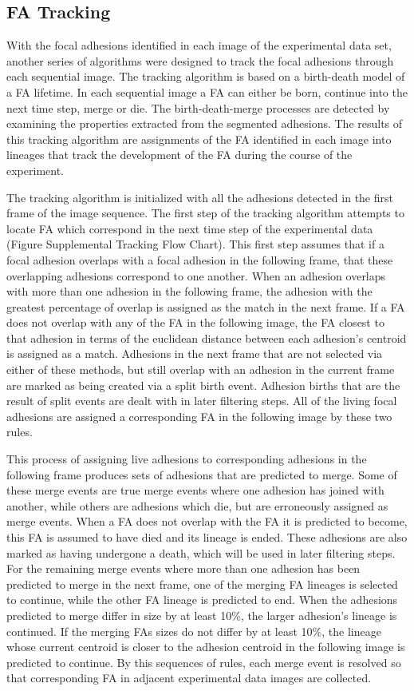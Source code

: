 \documentclass[10pt]{article}
\begin{document}
\subsection*{FA Tracking}

With the focal adhesions identified in each image of the experimental data set,
another series of algorithms were designed to track the focal adhesions through
each sequential image. The tracking algorithm is based on a birth-death model of
a FA lifetime. In each sequential image a FA can either be born, continue into
the next time step, merge or die. The birth-death-merge processes are detected
by examining the properties extracted from the segmented adhesions. The results
of this tracking algorithm are assignments of the FA identified in each image
into lineages that track the development of the FA during the course of the
experiment.

The tracking algorithm is initialized with all the adhesions detected in the
first frame of the image sequence. The first step of the tracking algorithm
attempts to locate FA which correspond in the next time step of the experimental
data (Figure Supplemental Tracking Flow Chart). This first step assumes that if
a focal adhesion overlaps with a focal adhesion in the following frame, that
these overlapping adhesions correspond to one another. When an adhesion overlaps
with more than one adhesion in the following frame, the adhesion with the
greatest percentage of overlap is assigned as the match in the next frame. If a
FA does not overlap with any of the FA in the following image, the FA closest to
that adhesion in terms of the euclidean distance between each adhesion's
centroid is assigned as a match. Adhesions in the next frame that are not
selected via either of these methods, but still overlap with an adhesion in the
current frame are marked as being created via a split birth event. Adhesion
births that are the result of split events are dealt with in later filtering
steps. All of the living focal adhesions are assigned a corresponding FA in the
following image by these two rules.

This process of assigning live adhesions to corresponding adhesions in the
following frame produces sets of adhesions that are predicted to merge. Some of
these merge events are true merge events where one adhesion has joined with
another, while others are adhesions which die, but are erroneously assigned as
merge events. When a FA does not overlap with the FA it is predicted to become,
this FA is assumed to have died and its lineage is ended. These adhesions are
also marked as having undergone a death, which will be used in later filtering
steps. For the remaining merge events where more than one adhesion has been
predicted to merge in the next frame, one of the merging FA lineages is selected
to continue, while the other FA lineage is predicted to end. When the adhesions
predicted to merge differ in size by at least 10\%, the larger adhesion's
lineage is continued. If the merging FAs sizes do not differ by at least 10\%,
the lineage whose current centroid is closer to the adhesion centroid in the
following image is predicted to continue. By this sequences of rules, each merge
event is resolved so that corresponding FA in adjacent experimental data images
are collected.
\end{document}
